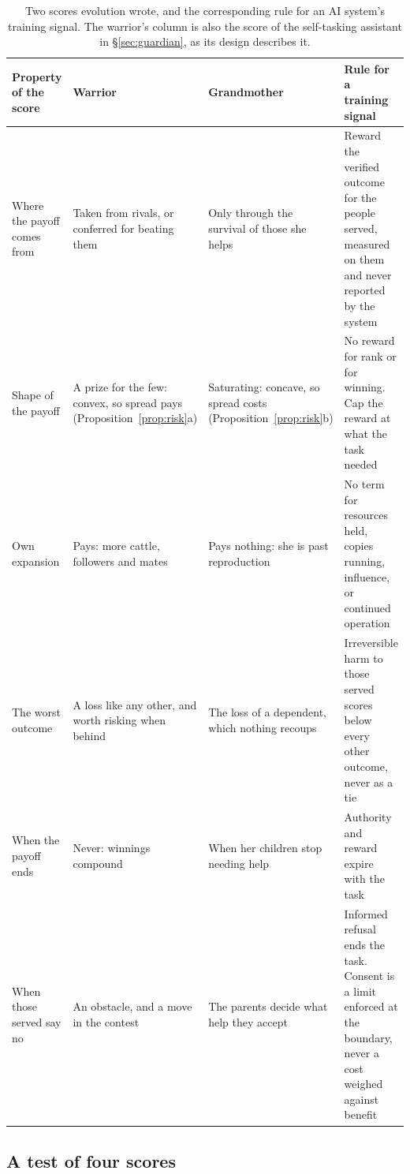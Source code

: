 \documentclass[10pt,twocolumn,letterpaper]{article}
\theoremstyle{definition}
\begin{document}
\begin{table}[t]
\centering
\footnotesize
\setlength{\tabcolsep}{5pt}
\renewcommand{\arraystretch}{1.16}
\begin{tabularx}{\textwidth}{@{}P{1.05in}P{1.45in}P{1.55in}L@{}}
\toprule
\textbf{Property of the score} & \textbf{Warrior} & \textbf{Grandmother} & \textbf{Rule for a training signal}\\
\midrule
Where the payoff comes from & Taken from rivals, or conferred for beating them & Only through the survival of those she helps & Reward the verified outcome for the people served, measured on them and never reported by the system\\
Shape of the payoff & A prize for the few: convex, so spread pays (Proposition~\ref{prop:risk}a) & Saturating: concave, so spread costs (Proposition~\ref{prop:risk}b) & No reward for rank or for winning. Cap the reward at what the task needed\\
Own expansion & Pays: more cattle, followers and mates & Pays nothing: she is past reproduction & No term for resources held, copies running, influence, or continued operation\\
The worst outcome & A loss like any other, and worth risking when behind & The loss of a dependent, which nothing recoups & Irreversible harm to those served scores below every other outcome, never as a tie\\
When the payoff ends & Never: winnings compound & When her children stop needing help & Authority and reward expire with the task\\
When those served say no & An obstacle, and a move in the contest & The parents decide what help they accept & Informed refusal ends the task. Consent is a limit enforced at the boundary, never a cost weighed against benefit\\
\bottomrule
\end{tabularx}
\caption{Two scores evolution wrote, and the corresponding rule for an AI system's training signal. The warrior's column is also the score of the self-tasking assistant in \S\ref{sec:guardian}, as its design describes it.}
\label{tab:scores}
\end{table}

\subsection{A test of four scores}
\label{sec:expscores}
\end{document}
